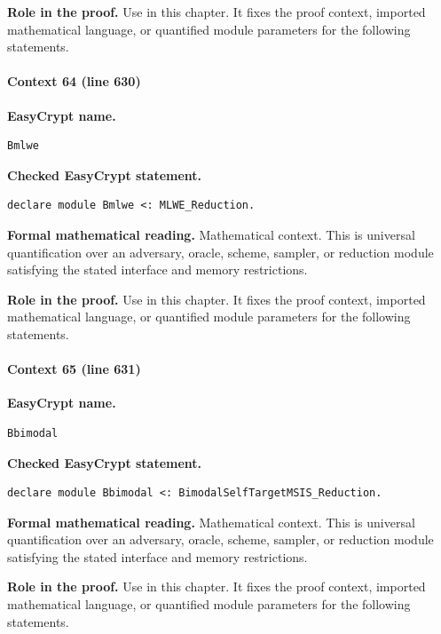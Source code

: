 \noindent\textbf{Role in the proof.}
Use in this chapter. It fixes the proof context, imported mathematical language, or quantified module parameters for the following statements.

\paragraph{Context 64 (line 630)}
\noindent\textbf{EasyCrypt name.}
\begin{lstlisting}[language=EasyCrypt,basicstyle=\ttfamily\scriptsize]
Bmlwe
\end{lstlisting}
\noindent\textbf{Checked EasyCrypt statement.}
\begin{lstlisting}[language=EasyCrypt,basicstyle=\ttfamily\scriptsize]
declare module Bmlwe <: MLWE_Reduction.
\end{lstlisting}
\noindent\textbf{Formal mathematical reading.}
Mathematical context. This is universal quantification over an adversary, oracle, scheme, sampler, or reduction module satisfying the stated interface and memory restrictions.

\noindent\textbf{Role in the proof.}
Use in this chapter. It fixes the proof context, imported mathematical language, or quantified module parameters for the following statements.

\paragraph{Context 65 (line 631)}
\noindent\textbf{EasyCrypt name.}
\begin{lstlisting}[language=EasyCrypt,basicstyle=\ttfamily\scriptsize]
Bbimodal
\end{lstlisting}
\noindent\textbf{Checked EasyCrypt statement.}
\begin{lstlisting}[language=EasyCrypt,basicstyle=\ttfamily\scriptsize]
declare module Bbimodal <: BimodalSelfTargetMSIS_Reduction.
\end{lstlisting}
\noindent\textbf{Formal mathematical reading.}
Mathematical context. This is universal quantification over an adversary, oracle, scheme, sampler, or reduction module satisfying the stated interface and memory restrictions.

\noindent\textbf{Role in the proof.}
Use in this chapter. It fixes the proof context, imported mathematical language, or quantified module parameters for the following statements.


